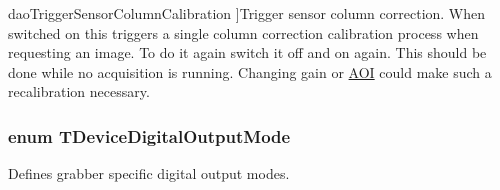 \begin{Desc}
\begin{description}
{\hypertarget{group___device_specific_interface_ggad8cdd91ea42682e1055b0fb168f2ea58ac7b5078db3a848dd15b5fba2fbcbbab8}{dao\+Trigger\+Sensor\+Column\+Calibration}\label{group___device_specific_interface_ggad8cdd91ea42682e1055b0fb168f2ea58ac7b5078db3a848dd15b5fba2fbcbbab8}
}]Trigger sensor column correction. When switched on this triggers a single column correction calibration process when requesting an image. To do it again switch it off and on again. This should be done while no acquisition is running. Changing gain or \hyperlink{struct_a_o_i}{A\+O\+I} could make such a recalibration necessary. \end{description}
\end{Desc}
\hypertarget{group___device_specific_interface_gad65061e17a93ca4a79e5b75d8ca78a27}{
\subsubsection[{T\+Device\+Digital\+Output\+Mode}]{\setlength{\rightskip}{0pt plus 5cm}enum {\bf T\+Device\+Digital\+Output\+Mode}}}\label{group___device_specific_interface_gad65061e17a93ca4a79e5b75d8ca78a27}


Defines grabber specific digital output modes. 


